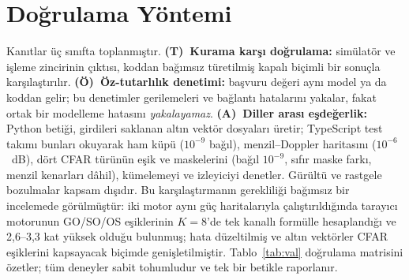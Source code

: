 \documentclass[conference,a4paper,10pt]{IEEEtran}
\begin{document}
\section{Doğrulama Yöntemi}
Kanıtlar üç sınıfta toplanmıştır. \textbf{(T)~Kurama karşı doğrulama:} simülatör ve işleme zincirinin çıktısı, koddan bağımsız türetilmiş kapalı biçimli bir sonuçla karşılaştırılır. \textbf{(Ö)~Öz-tutarlılık denetimi:} başvuru değeri aynı model ya da koddan gelir; bu denetimler gerilemeleri ve bağlantı hatalarını yakalar, fakat ortak bir modelleme hatasını \emph{yakalayamaz}. \textbf{(A)~Diller arası eşdeğerlik:} Python betiği, girdileri saklanan altın vektör dosyaları üretir; TypeScript test takımı bunları okuyarak ham küpü ($10^{-9}$ bağıl), menzil--Doppler haritasını ($10^{-6}$~dB), dört CFAR türünün eşik ve maskelerini (bağıl $10^{-9}$, sıfır maske farkı, menzil kenarları dâhil), kümelemeyi ve izleyiciyi denetler. Gürültü ve rastgele bozulmalar kapsam dışıdır. Bu karşılaştırmanın gerekliliği bağımsız bir incelemede görülmüştür: iki motor aynı güç haritalarıyla çalıştırıldığında tarayıcı motorunun GO/SO/OS eşiklerinin $K=8$'de tek kanallı formülle hesaplandığı ve 2,6--3,3 kat yüksek olduğu bulunmuş; hata düzeltilmiş ve altın vektörler CFAR eşiklerini kapsayacak biçimde genişletilmiştir. Tablo~\ref{tab:val} doğrulama matrisini özetler; tüm deneyler sabit tohumludur ve tek bir betikle raporlanır.
\end{document}
